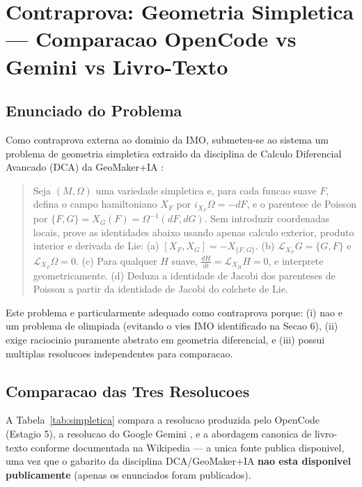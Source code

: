 \documentclass[5p]{elsarticle}
\begin{document}
\section{Contraprova: Geometria Simpletica — Comparacao OpenCode vs Gemini vs Livro-Texto}

\subsection{Enunciado do Problema}

Como contraprova externa ao dominio da IMO, submeteu-se ao sistema um problema
de geometria simpletica extraido da disciplina de Calculo Diferencial Avancado
(DCA) da GeoMaker+IA \cite{dca2026}:

\begin{quote}
Seja $(M,\Omega)$ uma variedade simpletica e, para cada funcao suave $F$,
defina o campo hamiltoniano $X_F$ por $i_{X_F}\Omega = -dF$, e o parentese de
Poisson por $\{F,G\} = X_G(F) = \Omega^{-1}(dF,dG)$. Sem introduzir coordenadas
locais, prove as identidades abaixo usando apenas calculo exterior, produto
interior e derivada de Lie:
(a) $[X_F,X_G] = -X_{\{F,G\}}$.
(b) $\mathcal{L}_{X_F}G = \{G,F\}$ e $\mathcal{L}_{X_F}\Omega = 0$.
(c) Para qualquer $H$ suave, $\frac{dH}{dt} = \mathcal{L}_{X_H}H = 0$, e
interprete geometricamente.
(d) Deduza a identidade de Jacobi dos parenteses de Poisson a partir da
identidade de Jacobi do colchete de Lie.
\end{quote}

Este problema e particularmente adequado como contraprova porque: (i) nao e
um problema de olimpiada (evitando o vies IMO identificado na Secao 6),
(ii) exige raciocinio puramente abstrato em geometria diferencial, e
(iii) possui multiplas resolucoes independentes para comparacao.

\subsection{Comparacao das Tres Resolucoes}

A Tabela~\ref{tab:simpletica} compara a resolucao produzida pelo OpenCode
(Estagio 5), a resolucao do Google Gemini \cite{gemini2026}, e a abordagem
canonica de livro-texto conforme documentada na Wikipedia \cite{wiki2026}
--- a unica fonte publica disponivel, uma vez que o gabarito da disciplina
DCA/GeoMaker+IA \cite{dca2026} \textbf{nao esta disponivel publicamente}
(apenas os enunciados foram publicados).
\end{document}
